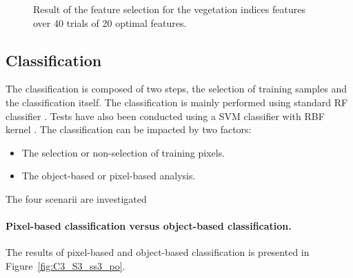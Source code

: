 \begin{figure} [htbp]%
\begin{center}
\end{center}
\caption{Result of the feature selection for the vegetation indices features over 40 trials of 20 optimal features.}
\label{fig:sel_indices}
\end{figure}


\subsection{Classification}
The classification is composed of two steps, the selection of training samples and the classification itself.
The classification is mainly performed using standard RF classifier \citep{opencv}. Tests have also been conducted using a SVM classifier with RBF kernel \citep{vapnik2013nature}. The classification can be impacted by two factors:
\begin{itemize}
\item The selection or non-selection of training pixels.
\item The object-based or pixel-based analysis.
\end{itemize}
The four scenarii are investigated

\paragraph{Pixel-based classification versus object-based classification. \\}
The results of pixel-based and object-based classification is presented in Figure~\ref{fig:C3_S3_ss3_po}.

